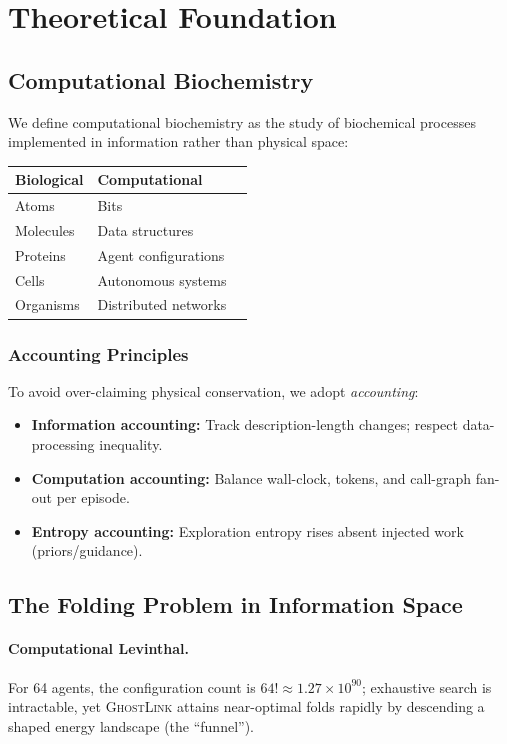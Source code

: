 \documentclass[11pt]{article}
\newcommand{\gl}{\textsc{GhostLink}}
\newcommand{\compbio}{computational biochemistry}
\begin{document}
\section{Theoretical Foundation}
\subsection{Computational Biochemistry}
We define \compbio{} as the study of biochemical processes implemented in information rather than physical space:
\begin{center}
\begin{tabular}{@{}lll@{}}
\toprule
\textbf{Biological} & \textbf{Computational} \\
\midrule
Atoms & Bits \\
Molecules & Data structures \\
Proteins & Agent configurations \\
Cells & Autonomous systems \\
Organisms & Distributed networks \\
\bottomrule
\end{tabular}
\end{center}
\subsubsection*{Accounting Principles}
To avoid over-claiming physical conservation, we adopt \emph{accounting}:
\begin{itemize}[leftmargin=1.2em]
\item \textbf{Information accounting:} Track description-length changes; respect data-processing inequality.
\item \textbf{Computation accounting:} Balance wall-clock, tokens, and call-graph fan-out per episode.
\item \textbf{Entropy accounting:} Exploration entropy rises absent injected work (priors/guidance).
\end{itemize}
\subsection{The Folding Problem in Information Space}
\paragraph{Computational Levinthal.} For 64 agents, the configuration count is $64!\approx 1.27\times 10^{90}$; exhaustive search is intractable, yet \gl{} attains near-optimal folds rapidly by descending a shaped energy landscape (the ``funnel'').
\end{document}

